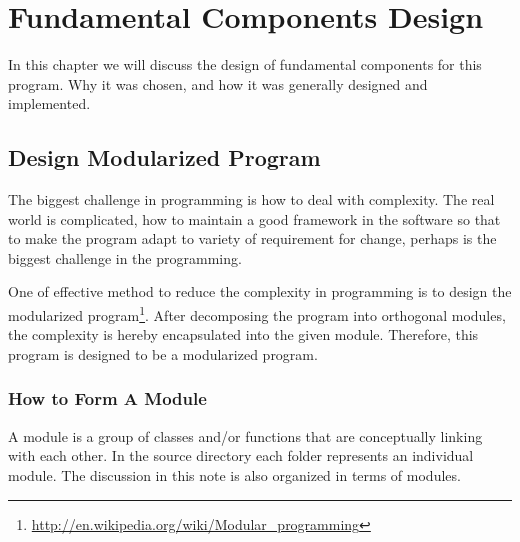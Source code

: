 %
% 
%
\chapter{Fundamental Components Design}
\label{fundamental_components_design}

In this chapter we will discuss the design of fundamental components for this 
program. Why it was chosen, and how it was generally designed and implemented.

\section{Design Modularized Program}
%
%
%
The biggest challenge in programming is how to deal with complexity.
The real world is complicated, how to maintain a good framework in the 
software so that to make the program adapt to variety of requirement for change,
perhaps is the biggest challenge in the programming.

One of effective method to reduce the complexity in programming is to
design the modularized program\footnote{
\url{http://en.wikipedia.org/wiki/Modular_programming}}. After 
decomposing the program into orthogonal modules, the complexity is 
hereby encapsulated into the given module. Therefore, this program is designed
to be a modularized program.

\subsection{How to Form A Module}
%
%
A module is a group of classes and/or functions that are conceptually linking 
with each other. In the source directory each folder represents an individual 
module. The discussion in this note is also organized in terms of modules.

